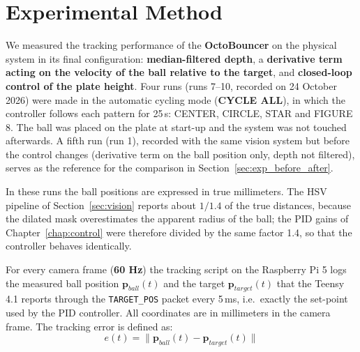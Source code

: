 
\section{Experimental Method}
\label{sec:exp_method}

We measured the tracking performance of the \textbf{OctoBouncer} on the physical system in its final configuration: \textbf{median-filtered depth}, a \textbf{derivative term acting on the velocity of the ball relative to the target}, and \textbf{closed-loop control of the plate height}. Four runs (runs 7--10, recorded on 24 October 2026) were made in the automatic cycling mode (\textbf{CYCLE ALL}), in which the controller follows each pattern for 25\,s: CENTER, CIRCLE, STAR and FIGURE 8. The ball was placed on the plate at start-up and the system was not touched afterwards. A fifth run (run 1), recorded with the same vision system but before the control changes (derivative term on the ball position only, depth not filtered), serves as the reference for the comparison in Section~\ref{sec:exp_before_after}.

In these runs the ball positions are expressed in true millimeters. The HSV pipeline of Section~\ref{sec:vision} reports about $1/1.4$ of the true distances, because the dilated mask overestimates the apparent radius of the ball; the PID gains of Chapter~\ref{chap:control} were therefore divided by the same factor 1.4, so that the controller behaves identically.

For every camera frame (\textbf{60 Hz}) the tracking script on the Raspberry Pi 5 logs the measured ball position $\mathbf{p}_{ball}(t)$ and the target $\mathbf{p}_{target}(t)$ that the Teensy 4.1 reports through the \texttt{TARGET\_POS} packet every 5\,ms, i.e.\ exactly the set-point used by the PID controller. All coordinates are in millimeters in the camera frame. The tracking error is defined as:
\begin{equation}
    e(t) = \lVert \mathbf{p}_{ball}(t) - \mathbf{p}_{target}(t) \rVert
\end{equation}

